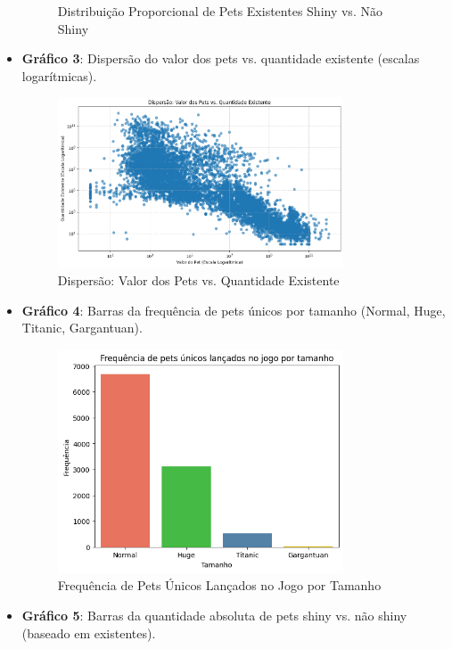 \documentclass[12pt]{article}
\begin{document}
\begin{itemize}
\begin{figure}[H]
         \caption{Distribuição Proporcional de Pets Existentes Shiny vs. Não Shiny}
     \end{figure}
    \item \textbf{Gráfico 3}: Dispersão do valor dos pets vs. quantidade existente (escalas logarítmicas).
     \begin{figure}[H]
         \centering
         \includegraphics[width=0.8\textwidth]{grafico3.png}
         \caption{Dispersão: Valor dos Pets vs. Quantidade Existente}
     \end{figure}
    \item \textbf{Gráfico 4}: Barras da frequência de pets únicos por tamanho (Normal, Huge, Titanic, Gargantuan).
     \begin{figure}[H]
         \centering
         \includegraphics[width=0.8\textwidth]{grafico4.png}
         \caption{Frequência de Pets Únicos Lançados no Jogo por Tamanho}
     \end{figure}
    \item \textbf{Gráfico 5}: Barras da quantidade absoluta de pets shiny vs. não shiny (baseado em existentes).
     \begin{figure}[H]

\end{figure}
\end{itemize}
\end{document}
